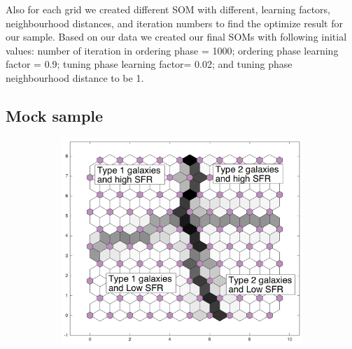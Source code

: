      Also for each grid we created different SOM with different, learning factors, neighbourhood distances, and iteration numbers to find the optimize result for our sample.
     Based on our data we created our final SOMs with following initial values: number of iteration in ordering phase = 1000; ordering phase learning factor = 0.9; tuning phase learning factor= 0.02; and tuning phase neighbourhood distance to be 1.
     

   
\subsection{Mock sample}
 
         \begin{figure}
            \begin{subfigure}[b]{0.5\textwidth}
                \centering
                \includegraphics[width=\textwidth]{../images0.01/sample/sample2_dist.png}
            \end{subfigure}
            \hfill
            \begin{subfigure}[b]{0.5\textwidth}

\end{subfigure}
\end{figure}
